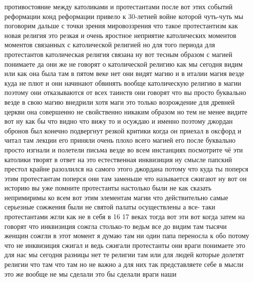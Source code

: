 противостояние между католиками и протестантами после
вот этих событий реформации конд реформации привело к 30-летней войне которой
чуть-чуть мы поговорим дальше с точки зрения мировоззрения что такое
протестантизм как новая религия это резкая и очень яростное неприятие
католических моментов моментов связанных с католической религией но для того
периода для протестантов католическая религия связана ну вот тесным образом с
магией понимаете да они же не говорят о католической религию как мы сегодня
видим или как она была там в пятом веке нет они видят магию и в италии магия
везде куда не плют и они начинают обвинять вообще католическую религию в магии
поэтому они отказываются от всех таинств они говорят что вы просто буквально
везде в свою магию внедрили хотя маги это только возрождение для древней церкви
она совершенно не свойственно никаким образом но тем не менее видите вот ну как
бы что видно что вижу то и осуждаю и именно поэтому джордан обронов был конечно
подвергнут резкой критики когда он приехал в оксфорд и читал там лекции его
приняли очень плохо всего магией его после буквально просто изгнали и полетели
письма везде во всем инстанциях посмотрите чё эти католики творят в ответ на это
естественная инквизиция ну смысле папский престол крайне разозлился на самого
этого джордана потому что куда ты поперся этим протестантам поперся они там
заменьше что называется сжигают ну вот он историю вы уже помните протестанты
настолько были не как сказать непримиримы ко всем вот этим элементам магии что
действительно самые серьезные сожжения были не святой палаты осуществлены а все-
таки протестантами жгли как не в себя в 16 17 веках тогда вот эти вот когда
затем на говорят что инквизиция сожгла столько-то ведьм все до видим там тысячи
женщин сожгли в этот момент я думаю там ни один папа переносла к обо потому что
не инквизиция сжигал и ведь сжигали протестанты они враги понимаете это для нас
мы сегодня разницы нет те религии там или для людей которые долетят религии что
там что там но не важно а для них так представляете себе в мысли это же вообще
не мы сделали это бы сделали враги наши 

